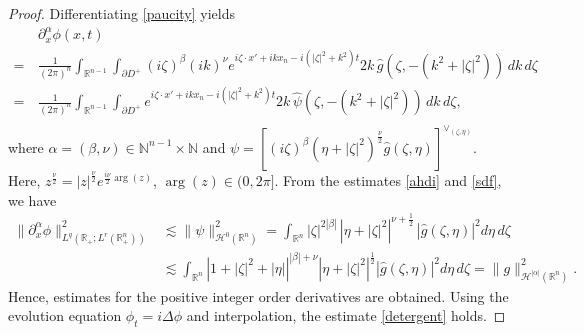 \documentclass[preprint,compress,12pt]{elsarticle}
\numberwithin{equation}{section}
\begin{document}
\begin{proof}
	Differentiating \eqref{paucity} yields
	\begin{equation}\label{meditation}
		\begin{aligned}		
			&\partial^{\alpha}_{x}\phi(x,t)\\
			=\,&\frac{1}{(2\pi)^{n}}\int_{\mathbb{R}^{n-1}}\int_{\partial D^{+}} (i\zeta)^{\beta}(ik)^{\nu}e^{i\zeta\cdot x'+ikx_{n}-i(|\zeta|^{2}+k^{2})t}2k\,\widehat{g}\left(\zeta,-(k^{2}+|\zeta|^{2})\right) \,dk\,d\zeta\\
			=\,&\frac{1}{(2\pi)^{n}}\int_{\mathbb{R}^{n-1}}\int_{\partial D^{+}}e^{i\zeta\cdot x'+ikx_{n}-i(|\zeta|^{2}+k^{2})t}2k\, \widehat{\psi}(\zeta,-(k^{2}+|\zeta|^{2}))  \,dk\,d\zeta,\\
		\end{aligned}
	\end{equation}
	where		 $\alpha=(\beta,\nu)\in \mathbb{N}^{n-1}\times\mathbb{N}$ and $\psi=\left[(i\zeta)^{\beta} (\eta+|\zeta|^{2})^{\frac{\nu}{2}} \widehat{g}(\zeta,\eta)\right]^{\vee_{(\zeta,\eta)}}$. Here, $z^{\frac{\nu}{2}}=|z|^{\frac{\nu}{2}}e^{\frac{i\nu}{2}\arg(z)}$, $\arg(z)\in (0,2\pi]$. From the estimates \eqref{ahdi} and \eqref{sdf}, we have
	\begin{equation*}
		\begin{aligned} \|\partial^{\alpha}_{x}\phi\|_{L^{q}(\mathbb{R}_{+};L^{r}(\mathbb{R}^{n}_{+}))}^{2}
			&\lesssim \|\psi\|_{\mathcal{H}^{0}(\mathbb{R}^{n})}^{2}
			=\int_{\mathbb{R}^{n}}|\zeta|^{2|\beta|} \, \left|\eta+|\zeta|^{2}\right|^{\nu+\frac{1}{2}}  \,   |\widehat{g}(\zeta,\eta)|^{2}d\eta\, d\zeta\\
			&\lesssim \int_{\mathbb{R}^{n}}\left|1+|\zeta|^{2}+|\eta|\right|^{|\beta|+\nu} \left|\eta+|\zeta|^{2}\right|^{\frac{1}{2}} \left|\widehat{g}(\zeta,\eta)\right|^{2}d\eta \, d\zeta=\|g\|_{\mathcal{H}^{|\alpha|}(\mathbb{R}^{n})}^{2}.
		\end{aligned}
	\end{equation*}
	Hence, estimates for the positive integer order derivatives are obtained. Using the evolution equation $\phi_{t}=i\Delta \phi$ and interpolation, the estimate \eqref{detergent} holds.
\end{proof}
\end{document}
